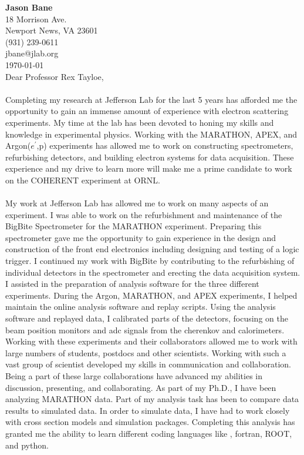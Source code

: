 \vspace*{-1.2cm}
{\textbf{Jason Bane}}\\
18 Morrison Ave. \\
Newport News, VA 23601 \\
(931) 239-0611 \\
jbane@jlab.org \\
\today\\

Dear Professor Rex Tayloe, 

\paragraph{}Completing my research at Jefferson Lab for the last 5 years has afforded me the opportunity to gain an immense amount of experience with electron scattering experiments. My time at the lab has been devoted to honing my skills and knowledge in experimental physics. Working with the MARATHON, APEX, and Argon($e^\prime$,p) experiments has allowed me to work on constructing spectrometers, refurbishing detectors, and building electron systems for data acquisition. These experience and my drive to learn more will make me a prime candidate to work on the COHERENT experiment at ORNL.
\paragraph{}My work at Jefferson Lab has allowed me to work on many aspects of an experiment. I was able to work on the refurbishment and maintenance of the BigBite Spectrometer for the MARATHON experiment. Preparing this spectrometer gave me the opportunity to gain experience in the design and construction of the front end electronics including designing and testing of a logic trigger. I continued my work with BigBite by contributing to the refurbishing of individual detectors in the spectrometer and erecting the data acquisition system. I assisted in the preparation of analysis software for the three different experiments. During the Argon, MARATHON, and APEX experiments, I helped maintain the online analysis software and replay scripts. Using the analysis software and replayed data, I calibrated parts of the detectors, focusing on the beam position monitors and adc signals from the cherenkov and calorimeters. Working with these experiments and their collaborators allowed me to work with large numbers of students, postdocs and other scientists.  Working with such a vast group of scientist developed my skills in communication and collaboration. Being a part of these large collaborations have advanced my abilities in discussion, presenting, and collaborating.
As part of my Ph.D., I have been analyzing MARATHON data. Part of my analysis task has been to compare data results to simulated data. In order to simulate data, I have had to work closely with cross section models and simulation packages. Completing this analysis has granted me the ability to learn different coding languages like \CPP, fortran, ROOT, and python.

